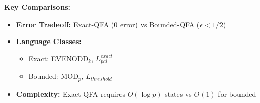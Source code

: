 \textbf{Key Comparisons:}
\begin{itemize}
    \item \textbf{Error Tradeoff:} Exact-QFA (0 error) vs Bounded-QFA ($\epsilon < 1/2$)
    \item \textbf{Language Classes:} 
    \begin{itemize}
        \item Exact: EVENODD$_k$, $L_{pal}^{exact}$
        \item Bounded: MOD$_p$, $L_{threshold}$
    \end{itemize}
    \item \textbf{Complexity:} Exact-QFA requires $O(\log p)$ states vs $O(1)$ for bounded
\end{itemize}